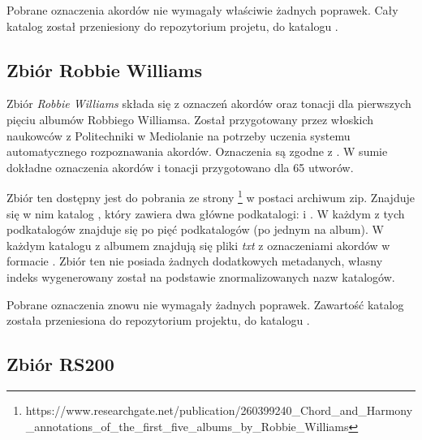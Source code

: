Pobrane oznaczenia akordów nie wymagały właściwie żadnych poprawek. Cały katalog
 został przeniesiony do repozytorium projetu, do katalogu
.

\subsection{Zbiór Robbie Williams}

Zbiór \emph{Robbie Williams} \cite{giorgi_automatic_2013} składa się z oznaczeń akordów oraz tonacji
dla pierwszych pięciu albumów Robbiego Williamsa. Został przygotowany przez włoskich naukowców z
Politechniki w Mediolanie na potrzeby uczenia systemu automatycznego rozpoznawania akordów.
Oznaczenia są zgodne z \cite{harte_towards_nodate}. W sumie dokładne oznaczenia akordów i tonacji
przygotowano dla 65 utworów.

Zbiór ten dostępny jest do pobrania ze strony
\footnote{https://www.researchgate.net/publication/260399240\_Chord\_and\_Harmony\_annotations\_of\_the\_first\_five\_albums\_by\_Robbie\_Williams}
w postaci archiwum zip. Znajduje się w nim katalog , który zawiera
dwa główne podkatalogi:  i . W każdym z tych podkatalogów znajduje się po pięć
podkatalogów (po jednym na album). W każdym katalogu z albumem znajdują się pliki \emph{txt} z
oznaczeniami akordów w formacie . Zbiór ten nie posiada żadnych dodatkowych metadanych,
własny indeks wygenerowany został na podstawie znormalizowanych nazw katalogów.

Pobrane oznaczenia znowu nie wymagały żadnych poprawek. Zawartość katalog
 została przeniesiona do repozytorium projektu, do katalogu
.

\subsection{Zbiór RS200}

